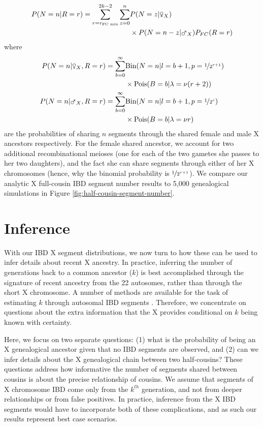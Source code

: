 \documentclass[9pt,twocolumn,twoside]{gsajnl}
\newcommand{\msxa}{\mars_X}
\newcommand{\fsxa}{\venus_X}
\begin{document}
\begin{align}
  \label{eq:prob-n-full-sibs}
  P(N = n | R=r) = \sum_{r=r_\text{FC min}}^{2k-2} \sum_{z=0}^{n} & P(N = z | \fsxa)  \nonumber\\
  & \times P(N = n - z | \msxa) P_{FC}(R=r)
\end{align}
%
where
%
\begin{align}
  P(N = n | \fsxa, R=r) = \sum_{b=0}^\infty & \text{Bin}(N=n | l = b+1, p=\nicefrac{1}{2^{r+1}})  \nonumber\\
  &\times \text{Pois}(B=b | \lambda = \nu (r+2)) \\
  P(N = n | \msxa, R=r) = \sum_{b=0}^\infty & \text{Bin}(N=n | l = b+1, p=\nicefrac{1}{2^r})  \nonumber \\
  &\times \text{Pois}(B=b | \lambda = \nu r) 
\end{align}
%
are the probabilities of sharing $n$ segments through the shared female and
male X ancestors respectively. For the female shared ancestor, we account for
two additional recombinational meioses (one for each of the two gametes she
passes to her two daughters), and the fact she can share segments through
either of her X chromosomes (hence, why the binomial probability is
$\nicefrac{1}{2^{r+1}}$). We compare our analytic X full-cousin IBD segment
number results to 5,000 genealogical simulations in Figure
\ref{fig:half-cousin-segment-number}.

\section*{Inference}
\label{sec:inf}

With our IBD X segment distributions, we now turn to how these can be used to
infer details about recent X ancestry. In practice, inferring the number of
generations back to a common ancestor ($k$) is best accomplished through the
signature of recent ancestry from the 22 autosomes, rather than through the
short X chromosome. A number of methods are available for the task of
estimating $k$ through autosomal IBD segments
\citep{huff2011maximum,Henn:2012ij,Durand010512}.  Therefore, we concentrate on
questions about the extra information that the X provides conditional on $k$
being known with certainty. 

Here, we focus on two separate questions: (1) what is the probability of being
an X genealogical ancestor given that no IBD segments are observed, and (2) can
we infer details about the X genealogical chain between two half-cousins?
These questions address how informative the number of segments shared between
cousins is about the precise relationship of cousins. We assume that segments
of X chromosome IBD come only from the $k^{th}$ generation, and not from deeper
relationships or from false positives. In practice, inference from the X IBD
segments would have to incorporate both of these complications, and as such our
results represent best case scenarios.
\end{document}
